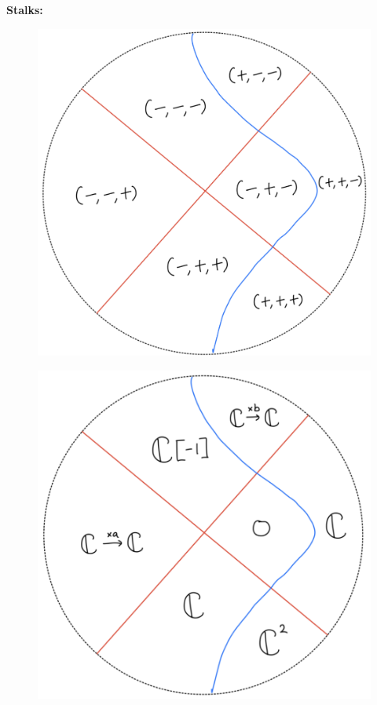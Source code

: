 \textbf{Stalks:}
\begin{figure}[H]
    \centering
    \includegraphics[scale = 0.95]{diagrams/lemma4/19.png}
    \caption{}
    \label{fig:your-label}
\end{figure}
\begin{figure}[H]
    \centering
    \includegraphics[scale = 0.95]{diagrams/lemma4/20.png}
    \caption{}
    \label{fig:your-label}
\end{figure}
